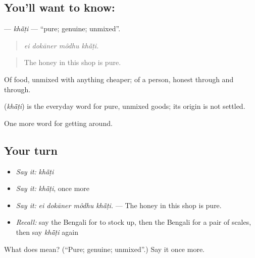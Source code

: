 \subsection*{You'll want to know: }
\textbf{} — \emph{khā̃ṭi} — \textquotedblleft{}pure; genuine; unmixed\textquotedblright{}.

\begin{quote}
   
\end{quote}

\begin{quote}
\emph{ei dokāner môdhu khā̃ṭi.}
\end{quote}

\begin{quote}
The honey in this shop is pure.
\end{quote}

Of food, unmixed with anything cheaper; of a person, honest through and through.

\begin{cousinweb}
\textbf{} (\emph{khā̃ṭi}) is the everyday word for pure, unmixed goods; its origin is not settled.
\end{cousinweb}

\begin{grammarlens}[title={What you've built}]
One more word for getting around.
\end{grammarlens}

\subsection*{Your turn}
\begin{itemize}
\raggedright
  \item \emph{Say it:} \emph{khā̃ṭi}
  \item \emph{Say it:} \emph{khā̃ṭi}, once more
  \item \emph{Say it:} \emph{ei dokāner môdhu khā̃ṭi.} — The honey in this shop is pure.
  \item \emph{Recall:} say the Bengali for to stock up, then the Bengali for a pair of scales, then say \emph{khā̃ṭi} again
\end{itemize}

\begin{tcolorbox}[breakable,colback=teal!4,colframe=teal!35!black,title={Before you move on}]
What does  mean? (\textquotedblleft{}Pure; genuine; unmixed\textquotedblright{}.) Say it once more.
\end{tcolorbox}
